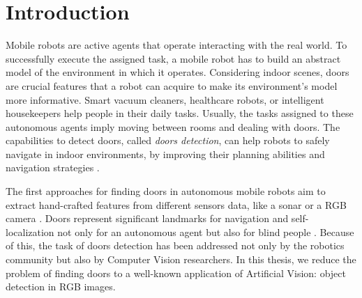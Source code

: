 
\hypertarget{Introduzione}{%
	\chapter{Introduction}\label{header-n3}}

Mobile robots are active agents that operate interacting with the real world. To successfully execute the assigned task, a mobile robot has to build an abstract model of the environment in which it operates. Considering indoor scenes, doors are crucial features that a robot can acquire to make its environment's model more informative.  Smart vacuum cleaners, healthcare robots, or intelligent housekeepers help people in their daily tasks. Usually, the tasks assigned to these autonomous agents imply moving between rooms and dealing with doors. The capabilities to detect doors, called \emph{doors detection}, can help robots to safely navigate in indoor environments, by improving their planning abilities and navigation strategies \cite{sonarandivisualdoordetection, doorsandnavigation, humanoid}. 

The first approaches for finding doors in autonomous mobile robots aim to extract hand-crafted features from different sensors data, like a sonar \cite{sonarandivisualdoordetection} or a RGB camera \cite{humanoid}. Doors represent significant landmarks for navigation and self-localization not only for an autonomous agent but also for blind people \cite{edgeandcornerdoorsdetector}. Because of this, the task of doors detection has been addressed not only by the robotics community but also by Computer Vision researchers. In this thesis, we reduce the problem of finding doors to a well-known application of Artificial Vision: object detection in RGB images. 

